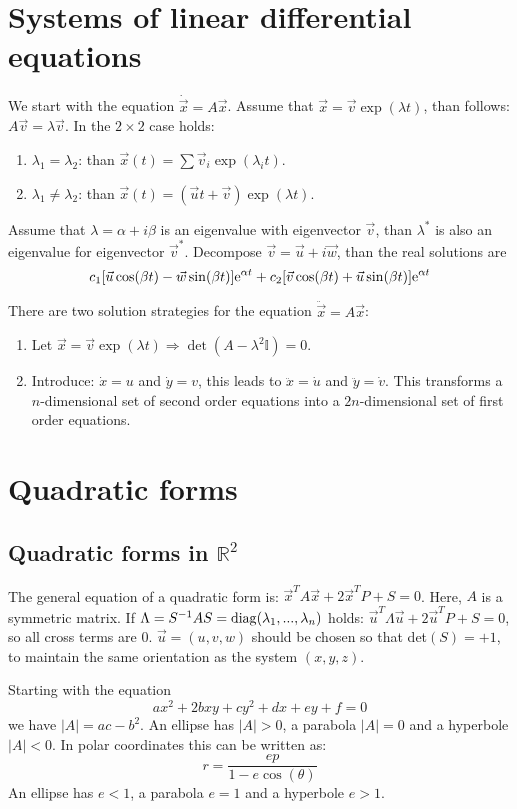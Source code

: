 \section{Systems of linear differential equations}
We start with the equation $\dot{\vec{x}}=A\vec{x}$. Assume that
$\vec{x}=\vec{v}\exp(\lambda t)$, than follows: $A\vec{v}=\lambda\vec{v}$.
In the $2\times2$ case holds:
\begin{enumerate}
	\item $\lambda_1=\lambda_2$: than $\vec{x}(t)=\sum\vec{v}_i\exp(\lambda_it)$.
	\item $\lambda_1\neq\lambda_2$: than $\vec{x}(t)=(\vec{u}t+\vec{v})\exp(\lambda t)$.
\end{enumerate}
Assume that $\lambda=\alpha+i\beta$ is an eigenvalue with eigenvector $\vec{v}$,
than $\lambda^*$ is also an eigenvalue for eigenvector $\vec{v}^*$. Decompose
$\vec{v}=\vec{u}+i\vec{w}$, than the real solutions are
\[
c_1[\vec{u}\cos(\beta t)-\vec{w}\sin(\beta t)]{\rm e}^{\alpha t}+c_2[\vec{v}\cos(\beta t)+\vec{u}\sin(\beta t)]{\rm e}^{\alpha t}
\]
 
There are two solution strategies for the equation $\ddot{\vec{x}}=A\vec{x}$:
\begin{enumerate}
	\item Let $\vec{x}=\vec{v}\exp(\lambda t)\Rightarrow\det(A-\lambda^2 \mathbb{I})=0$.
	\item Introduce: $\dot{x}=u$ and $\dot{y}=v$, this leads to $\ddot{x}=\dot{u}$ and
	$\ddot{y}=\dot{v}$. This transforms a $n$-dimensional set of second order
	equations into a $2n$-dimensional set of first order equations. 
\end{enumerate}

\section{Quadratic forms}
\subsection{Quadratic forms in $ \mathbb{R}^2$}
The general equation of a quadratic form is:
$\vec{x}^TA\vec{x}+2\vec{x}^TP+S=0$. Here, $A$ is a symmetric matrix.
If $\Lambda=S^{-1}AS={\rm diag}(\lambda_1,...,\lambda_n)$ holds:
$\vec{u}^T\Lambda\vec{u}+2\vec{u}^TP+S=0$, so all cross terms are 0.
$\vec{u}=(u,v,w)$ should be chosen so that det$(S)=+1$,
to maintain the same orientation as the system $(x,y,z)$.
 
Starting with the equation
\[
ax^2+2bxy+cy^2+dx+ey+f=0
\]
we have $|A|=ac-b^2$. An ellipse has $|A|>0$, a parabola $|A|=0$ and
a hyperbole $|A|<0$. In polar coordinates this can be written as:
\[
r=\frac{ep}{1-e\cos(\theta)}
\]
An ellipse has $e<1$, a parabola $e=1$ and a hyperbole $e>1$.


